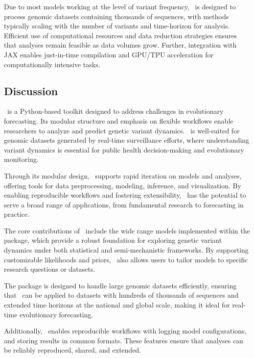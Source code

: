 Due to most models working at the level of variant frequency, \evofr\ is designed to process genomic datasets containing thousands of sequences, with methods typically scaling with the number of variants and time-horizon for analysis.
Efficient use of computational resources and data reduction strategies ensures that analyses remain feasible as data volumes grow.
Further, integration with JAX enables just-in-time compilation and GPU/TPU acceleration for computationally intensive tasks.

\subsection{Discussion}

\evofr\ is a Python-based toolkit designed to address challenges in evolutionary forecasting.
Its modular structure and emphasis on flexible workflows enable researchers to analyze and predict genetic variant dynamics.
\evofr\ is well-suited for genomic datasets generated by real-time surveillance efforts, where understanding variant dynamics is essential for public health decision-making and evolutionary monitoring.

Through its modular design, \evofr\ supports rapid iteration on models and analyses, offering tools for data preprocessing, modeling, inference, and visualization. 
By enabling reproducible workflows and fostering extensibility, \evofr\ has the potential to serve a broad range of applications, from fundamental research to forecasting in practice.

The core contributions of \evofr\ include the wide range models implemented within the package, which provide a robust foundation for exploring genetic variant dynamics under both statistical and semi-mechanistic frameworks.
By supporting customizable likelihoods and priors, \evofr\ also allows users to tailor models to specific research questions or datasets.

The package is designed to handle large genomic datasets efficiently, ensuring that \evofr\ can be applied to datasets with hundreds of thousands of sequences and extended time horizons at the national and global scale, making it ideal for real-time evolutionary forecasting.

Additionally, \evofr\ enables reproducible workflows with logging model configurations, and storing results in common formats.
These features ensure that analyses can be reliably reproduced, shared, and extended.

